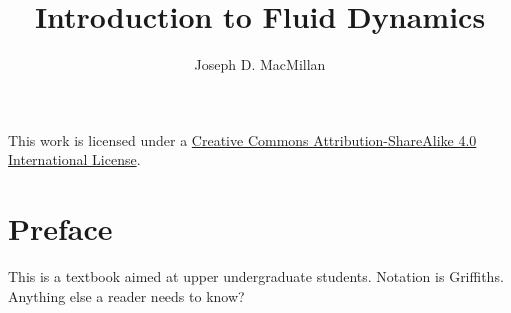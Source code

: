 \documentclass[10pt, a5paper, twoside, openany]{memoir}
\title{Introduction to Fluid Dynamics}
\author{Joseph D. MacMillan}
\date{}
\begin{document}
\frontmatter

\maketitle

{\small This work is licensed under a \href{https://creativecommons.org/licenses/by-sa/4.0/}{Creative Commons Attribution-ShareAlike 4.0 International License}.}



\newpage

\tableofcontents

\chapter{Preface}

This is a textbook aimed at upper undergraduate students.  Notation is Griffiths.  Anything else a reader needs to know?


\mainmatter














%
\end{document}
